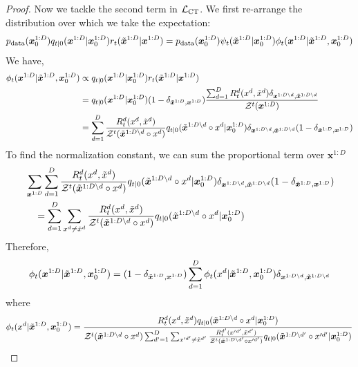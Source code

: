 \documentclass{article}
\begin{document}
\begin{proof}
Now we tackle the second term in $\mathcal{L}_{\textup{CT}}$. We first re-arrange the distribution over which we take the expectation:
\begin{equation}
    p_{\textup{data}}(\bm{x}_0^{1:D}) q_{t|0}(\bm{x}^{1:D} | \bm{x}_0^{1:D}) r_t(\tilde{\bm{x}}^{1:D} | \bm{x}^{1:D}) = p_{\textup{data}}(\bm{x}_0^{1:D}) \psi_t(\tilde{\bm{x}}^{1:D} | \bm{x}_0^{1:D}) \phi_t(\bm{x}^{1:D} | \tilde{\bm{x}}^{1:D}, \bm{x}_0^{1:D}) 
\end{equation}
We have,
\begin{align}
    \phi_t(\bm{x}^{1:D} | \tilde{\bm{x}}^{1:D}, \bm{x}_0^{1:D}) &\propto q_{t|0}(\bm{x}^{1:D} | \bm{x}_0^{1:D}) r_t(\tilde{\bm{x}}^{1:D} | \bm{x}^{1:D})\\
    & = q_{t|0}(\bm{x}^{1:D} | \bm{x}_0^{1:D}) ( 1- \delta_{\tilde{\bm{x}}^{1:D}, \bm{x}^{1:D}}) \frac{\sum_{d=1}^D R_t^d(x^d, \tilde{x}^d) \delta_{\bm{x}^{1:D \backslash d}, \tilde{\bm{x}}^{1:D \backslash d}}}{\mathcal{Z}^t(\bm{x}^{1:D})}\\
    & = \sum_{d=1}^D \frac{R_t^d(x^d, \tilde{x}^d)}{\mathcal{Z}^t(\tilde{\bm{x}}^{1:D \backslash d} \circ x^d  )} q_{t|0}(\tilde{\bm{x}}^{1:D \backslash d} \circ x^d | \bm{x}_0^{1:D})\delta_{\bm{x}^{1:D \backslash d}, \tilde{\bm{x}}^{1:D \backslash d}} ( 1- \delta_{\tilde{\bm{x}}^{1:D}, \bm{x}^{1:D}})  \\
\end{align}
To find the normalization constant, we can sum the proportional term over $\bm{x}^{1:D}$
\begin{align}
    &\sum_{\bm{x}^{1:D}} \sum_{d=1}^D \frac{R_t^d(x^d, \tilde{x}^d)}{\mathcal{Z}^t(\tilde{\bm{x}}^{1:D \backslash d} \circ x^d  )} q_{t|0}(\tilde{\bm{x}}^{1:D \backslash d} \circ x^d | \bm{x}_0^{1:D})  \delta_{\bm{x}^{1:D \backslash d}, \tilde{\bm{x}}^{1:D \backslash d}} ( 1- \delta_{\tilde{\bm{x}}^{1:D}, \bm{x}^{1:D}})\\
    & \quad = \sum_{d=1}^D \sum_{x^d \neq \tilde{x}^d} \frac{R_t^d(x^d, \tilde{x}^d)}{\mathcal{Z}^t(\tilde{\bm{x}}^{1:D \backslash d} \circ x^d  )} q_{t|0}(\tilde{\bm{x}}^{1:D \backslash d} \circ x^d | \bm{x}_0^{1:D})
\end{align}
Therefore,
\begin{equation}
    \phi_t(\bm{x}^{1:D} | \tilde{\bm{x}}^{1:D}, \bm{x}_0^{1:D}) = (1-\delta_{\tilde{\bm{x}}^{1:D}, \bm{x}^{1:D}}) \sum_{d=1}^D \phi_t(x^d | \tilde{\bm{x}}^{1:D}, \bm{x}_0^{1:D}) \delta_{\bm{x}^{1:D \backslash d}, \tilde{\bm{x}}^{1:D \backslash d}}
\end{equation}
where
\begin{equation}
    \dtwo(x^d | \tilde{\bm{x}}^{1:D}, \bm{x}_0^{1:D}) = \frac{R_t^d(x^d, \tilde{x}^d)  q_{t|0}(\tilde{\bm{x}}^{\Dd} \circ x^d | \bm{x}_0^{1:D})}{\mathcal{Z}^t(\tilde{\bm{x}}^{\Dd} \circ x^d  )   \sum_{d'=1}^D \sum_{x'^{d'} \neq \tilde{x}^{d'}} \frac{R_t^{d'}(x'^{d'}, \tilde{x}^{d'})}{\mathcal{Z}^t(\tilde{\bm{x}}^{1:D \backslash {d'}} \circ x'^{d'}  )} q_{t|0}(\tilde{\bm{x}}^{1:D \backslash d'} \circ x'^{d'} | \bm{x}_0^{1:D})}

\end{equation}
\end{proof}
\end{document}
